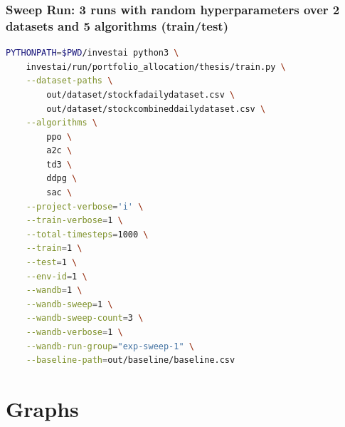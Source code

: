 \documentclass[../xlapes02]{subfiles}
\begin{document}
    \subsection{Sweep Run: 3 runs with random hyperparameters over 2 datasets and 5 algorithms (train/test)}\label{subsec:sweep-run:-3-runs-with-random-hyperparameters-over-2-datasets-and-5-algorithms-(train/test)}
    \begin{lstlisting}[language=bash,label={lst:sweep-train}]
PYTHONPATH=$PWD/investai python3 \
    investai/run/portfolio_allocation/thesis/train.py \
    --dataset-paths \
        out/dataset/stockfadailydataset.csv \
        out/dataset/stockcombineddailydataset.csv \
    --algorithms \
        ppo \
        a2c \
        td3 \
        ddpg \
        sac \
    --project-verbose='i' \
    --train-verbose=1 \
    --total-timesteps=1000 \
    --train=1 \
    --test=1 \
    --env-id=1 \
    --wandb=1 \
    --wandb-sweep=1 \
    --wandb-sweep-count=3 \
    --wandb-verbose=1 \
    --wandb-run-group="exp-sweep-1" \
    --baseline-path=out/baseline/baseline.csv
    \end{lstlisting}


    \chapter{Graphs}\label{ch:graphs}
\end{document}
